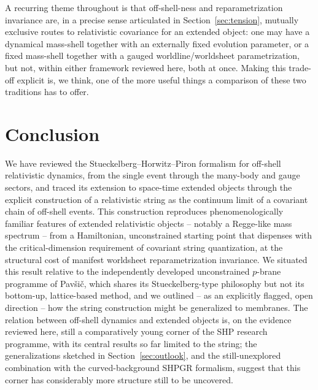 \documentclass[11pt]{article}
\begin{document}
A recurring theme throughout is that off-shell-ness and reparametrization
invariance are, in a precise sense articulated in
Section~\ref{sec:tension}, mutually exclusive routes to relativistic covariance
for an extended object: one may have a dynamical mass-shell together with an
externally fixed evolution parameter, or a fixed mass-shell together with a
gauged worldline/worldsheet parametrization, but not, within either framework
reviewed here, both at once. Making this trade-off explicit is, we think, one
of the more useful things a comparison of these two traditions has to offer.


\section{Conclusion}
\label{sec:conclusion}

We have reviewed the Stueckelberg--Horwitz--Piron formalism for off-shell
relativistic dynamics, from the single event through the many-body and gauge
sectors, and traced its extension to space-time extended objects through the
explicit construction of a relativistic string as the continuum limit of a
covariant chain of off-shell events. This construction reproduces
phenomenologically familiar features of extended relativistic objects --
notably a Regge-like mass spectrum -- from a Hamiltonian, unconstrained
starting point that dispenses with the critical-dimension requirement of
covariant string quantization, at the structural cost of manifest worldsheet
reparametrization invariance. We situated this result relative to the
independently developed unconstrained $p$-brane programme of Pavši\v{c}, which
shares its Stueckelberg-type philosophy but not its bottom-up, lattice-based
method, and we outlined -- as an explicitly flagged, open direction -- how the
string construction might be generalized to membranes. The relation between
off-shell dynamics and extended objects is, on the evidence reviewed here,
still a comparatively young corner of the SHP research programme, with its
central results so far limited to the string; the generalizations sketched in
Section~\ref{sec:outlook}, and the still-unexplored combination with the
curved-background SHPGR formalism, suggest that this corner has considerably
more structure still to be uncovered.


\appendix
\end{document}
